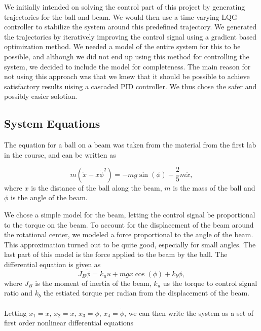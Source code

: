 We initially intended on solving the control part of this project by generating trajectories for the ball and beam.
We would then use a time-varying LQG controller to stabilize the system around this predefined trajectory.
We generated the trajectories by iteratively improving the control signal using a gradient based optimization method.
We needed a model of the entire system for this to be possible, and although we did not end up using this method for controlling the system, we decided to include the model for completeness.
The main reason for not using this approach was that we knew that it should be possible to achieve satisfactory results uising a cascaded PID controller.
We thus chose the safer and possibly easier solotion.

\subsection{System Equations}


The equation for a ball on a beam was taken from the material from the first lab in the course, and can be written as

\begin{equation}
m(\ddot{x}-x\dot{\phi}^{2})=-mg\sin(\phi)-\frac{2}{5}m\ddot{x},
\end{equation}
where $x$ is the distance of the ball along the beam, $m$ is the mass of the ball and $\phi$ is the angle of the beam.

We chose a simple model for the beam, letting the control signal be proportional to the torque on the beam.
To account for the displacement of the beam around the rotational center, we modeled a force proportional to the angle of the beam.
This approximation turned out to be quite good, especially for small angles.
The last part of this model is the force applied to the beam by the ball.
The differential equation is given as
\begin{equation}
J_{B}\ddot{\phi}=k_{u}u+mgx\cos(\phi)+k_b\phi,
\end{equation}
where $J_{B}$ is the moment of inertia of the beam, $k_u$ us the torque to control signal ratio and $k_b$ the estiated torque per radian from the displacement of the beam.\\
\\
Letting $x_{1}=x,\, x_{2}=\dot{x},\, x_{3}=\phi,\, x_{4}=\dot{\phi}$,
we can then write the system as a set of first order nonlinear differential equations

%
%
%
%

